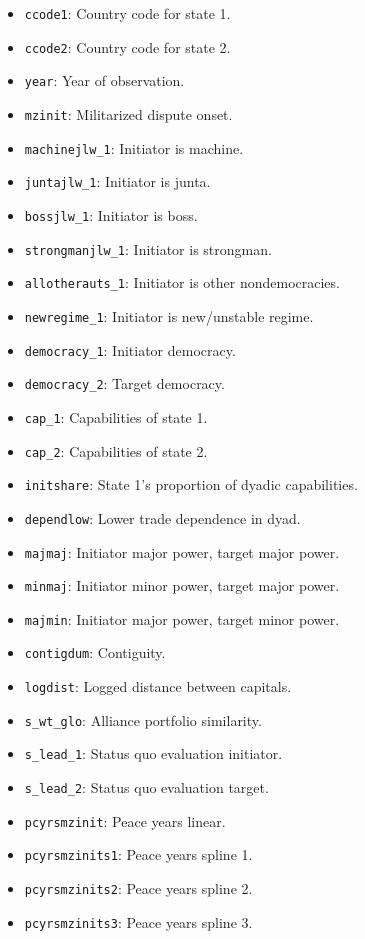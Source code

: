 \documentclass[12pt]{article}
\begin{document}
\begin{itemize}
  \item \texttt{ccode1}: Country code for state 1.
  \item \texttt{ccode2}: Country code for state 2.
  \item \texttt{year}: Year of observation.
  \item \texttt{mzinit}: Militarized dispute onset.
  \item \texttt{machinejlw\_1}: Initiator is machine.
  \item \texttt{juntajlw\_1}: Initiator is junta.
  \item \texttt{bossjlw\_1}: Initiator is boss.
  \item \texttt{strongmanjlw\_1}: Initiator is strongman.
  \item \texttt{allotherauts\_1}: Initiator is other nondemocracies.
  \item \texttt{newregime\_1}: Initiator is new/unstable regime.
  \item \texttt{democracy\_1}: Initiator democracy.
  \item \texttt{democracy\_2}: Target democracy.
  \item \texttt{cap\_1}: Capabilities of state 1.
  \item \texttt{cap\_2}: Capabilities of state 2. 
  \item \texttt{initshare}: State 1's proportion of dyadic capabilities.
  \item \texttt{dependlow}: Lower trade dependence in dyad.
  \item \texttt{majmaj}: Initiator major power, target major power.
  \item \texttt{minmaj}: Initiator minor power, target major power.
  \item \texttt{majmin}: Initiator major power, target minor power.
  \item \texttt{contigdum}: Contiguity.
  \item \texttt{logdist}: Logged distance between capitals.
  \item \texttt{s\_wt\_glo}: Alliance portfolio similarity.
  \item \texttt{s\_lead\_1}: Status quo evaluation initiator.
  \item \texttt{s\_lead\_2}: Status quo evaluation target.
  \item \texttt{pcyrsmzinit}: Peace years linear.
  \item \texttt{pcyrsmzinits1}: Peace years spline 1.
  \item \texttt{pcyrsmzinits2}: Peace years spline 2.
  \item \texttt{pcyrsmzinits3}: Peace years spline 3.
\end{itemize}
\end{document}
